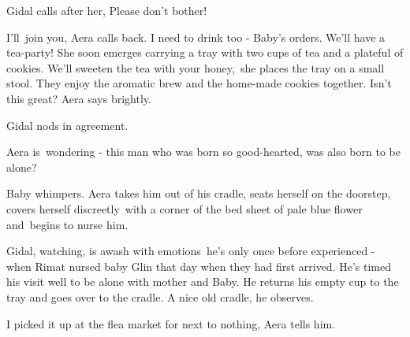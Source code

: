 \documentclass[letterpaper]{article}
\begin{document}
Gidal calls after her, {\textquotedbl}Please don't bother!{\textquotedbl}

{\textquotedbl}I'll\ join you,{\textquotedbl} Aera calls back. {\textquotedbl}I need to drink too - Baby's orders. We'll
have a tea-party!{\textquotedbl} She soon emerges carrying a tray with two cups of tea and a plateful of cookies.
{\textquotedbl}We'll sweeten the tea with your honey,{\textquotedbl}\textcolor[rgb]{0.0,0.4392157,0.7529412}{\ }she
places the tray on a small stool. They enjoy the aromatic brew and the home-made cookies together. {\textquotedbl}Isn't
this great?{\textquotedbl} Aera says brightly. 

Gidal nods in agreement. 

Aera is\ wondering - this man who was born so good-hearted, was also born to be alone?

Baby whimpers. Aera takes him out of his cradle, seats herself on the doorstep, covers herself
discreetly\textcolor[rgb]{0.0,0.4392157,0.7529412}{\ }with a corner of the bed sheet of pale blue flower and~begins to
nurse him. 

Gidal, watching, is awash with emotions\textcolor{red}{\ }he's only once before experienced - when Rimat nursed baby
Glin that day when they had first arrived. He's timed his visit well to be alone with mother and Baby. He returns his
empty cup to the tray and goes over to the cradle. {\textquotedbl}A nice old cradle,{\textquotedbl} he
observes\textcolor[rgb]{0.0,0.4392157,0.7529412}{.}

{\textquotedbl}I picked it up at the flea market for next to nothing,{\textquotedbl} Aera tells
him\textcolor[rgb]{0.0,0.4392157,0.7529412}{.}
\end{document}
